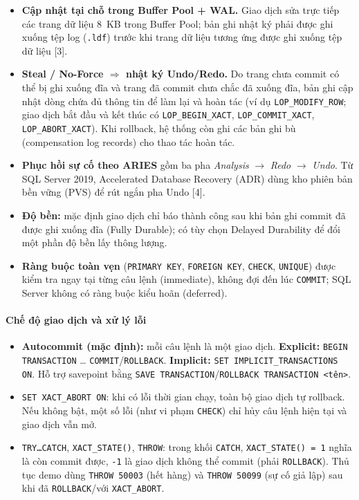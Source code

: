 \begin{itemize}
    \item \textbf{Cập nhật tại chỗ trong Buffer Pool + WAL.} Giao dịch sửa trực tiếp các trang dữ liệu 8~KB trong Buffer Pool; bản ghi nhật ký phải được ghi xuống tệp log (\texttt{.ldf}) trước khi trang dữ liệu tương ứng được ghi xuống tệp dữ liệu [3].
    \item \textbf{Steal / No-Force $\Rightarrow$ nhật ký Undo/Redo.} Do trang chưa commit có thể bị ghi xuống đĩa và trang đã commit chưa chắc đã xuống đĩa, bản ghi cập nhật dòng chứa đủ thông tin để làm lại và hoàn tác (ví dụ \texttt{LOP\_MODIFY\_ROW}; giao dịch bắt đầu và kết thúc có \texttt{LOP\_BEGIN\_XACT}, \texttt{LOP\_COMMIT\_XACT}, \texttt{LOP\_ABORT\_XACT}). Khi rollback, hệ thống còn ghi các bản ghi bù (compensation log records) cho thao tác hoàn tác.
    \item \textbf{Phục hồi sự cố theo ARIES} gồm ba pha \textit{Analysis} $\rightarrow$ \textit{Redo} $\rightarrow$ \textit{Undo}. Từ SQL Server 2019, Accelerated Database Recovery (ADR) dùng kho phiên bản bền vững (PVS) để rút ngắn pha Undo [4].
    \item \textbf{Độ bền:} mặc định giao dịch chỉ báo thành công sau khi bản ghi commit đã được ghi xuống đĩa (Fully Durable); có tùy chọn Delayed Durability để đổi một phần độ bền lấy thông lượng.
    \item \textbf{Ràng buộc toàn vẹn} (\texttt{PRIMARY KEY}, \texttt{FOREIGN KEY}, \texttt{CHECK}, \texttt{UNIQUE}) được kiểm tra ngay tại từng câu lệnh (immediate), không đợi đến lúc \texttt{COMMIT}; SQL Server không có ràng buộc kiểu hoãn (deferred).
\end{itemize}

\paragraph{Chế độ giao dịch và xử lý lỗi}\mbox{}

\begin{itemize}
    \item \textbf{Autocommit (mặc định):} mỗi câu lệnh là một giao dịch. \textbf{Explicit:} \texttt{BEGIN TRANSACTION} \ldots{} \texttt{COMMIT}/\texttt{ROLLBACK}. \textbf{Implicit:} \texttt{SET IMPLICIT\_TRANSACTIONS ON}. Hỗ trợ savepoint bằng \texttt{SAVE TRANSACTION}/\texttt{ROLLBACK TRANSACTION <tên>}.
    \item \texttt{SET XACT\_ABORT ON}: khi có lỗi thời gian chạy, toàn bộ giao dịch tự rollback. Nếu không bật, một số lỗi (như vi phạm \texttt{CHECK}) chỉ hủy câu lệnh hiện tại và giao dịch vẫn mở.
    \item \texttt{TRY\ldots CATCH}, \texttt{XACT\_STATE()}, \texttt{THROW}: trong khối \texttt{CATCH}, \texttt{XACT\_STATE() = 1} nghĩa là còn commit được, \texttt{-1} là giao dịch không thể commit (phải \texttt{ROLLBACK}). Thủ tục demo dùng \texttt{THROW 50003} (hết hàng) và \texttt{THROW 50099} (sự cố giả lập) sau khi đã \texttt{ROLLBACK}/với \texttt{XACT\_ABORT}.
\end{itemize}

